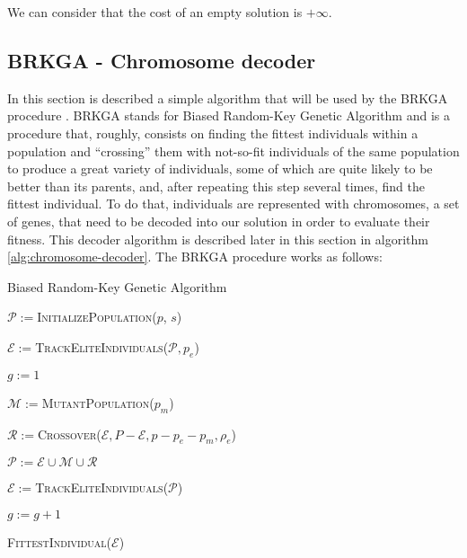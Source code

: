 \hfill

We can consider that the cost of an empty solution is $+\infty$.

\subsection{BRKGA - Chromosome decoder}
\label{sec:metaheuristics:chromosome-decoder}

In this section is described a simple algorithm that will be used by the BRKGA procedure
\cite{brkga}. BRKGA stands for Biased Random-Key Genetic Algorithm and is a procedure that,
roughly, consists on finding the fittest individuals within a population and ``crossing'' them with
not-so-fit individuals of the same population to produce a great variety of individuals,
some of which are quite likely to be better than its parents, and, after repeating this
step several times, find the fittest individual. To do that, individuals are represented with
chromosomes, a set of genes, that need to be decoded into our solution in order to evaluate
their fitness. This decoder algorithm is described later in this section in algorithm
\ref{alg:chromosome-decoder}. The BRKGA procedure works as follows:

\hfill

\begin{algorithm}[H]
    \label{alg:brkga}
    \DontPrintSemicolon
    
    \caption{Biased Random-Key Genetic Algorithm}
    
     {
        $\mathcal{P} := $\textsc{InitializePopulation}($p$, $s$)
            \label{alg:brkga:initialize-pop}\;
            
        $\mathcal{E} := $\textsc{TrackEliteIndividuals}($\mathcal{P}, p_e$)
            \label{alg:brkga:initialize-elite}\;
        
        $g := 1$\;
         {
            $\mathcal{M} := $\textsc{MutantPopulation}($p_m$)
                \label{alg:brkga:gen-mutant}\;
                
            $\mathcal{R} := $\textsc{Crossover}($\mathcal{E}, P-\mathcal{E}, p - p_e - p_m,
            \rho_e$)
                \label{alg:brkga:gen-cross}\;
            
            $\mathcal{P} := \mathcal{E} \cup \mathcal{M} \cup \mathcal{R} $
                \label{alg:brkga:redefine}\;
                
            $\mathcal{E} := $\textsc{TrackEliteIndividuals}($\mathcal{P}$)
                \label{alg:brkga:keep-track}\;
            
            $g := g + 1$\;
        }
        \Return \textsc{FittestIndividual}($\mathcal{E}$)\;
    }
\end{algorithm}

